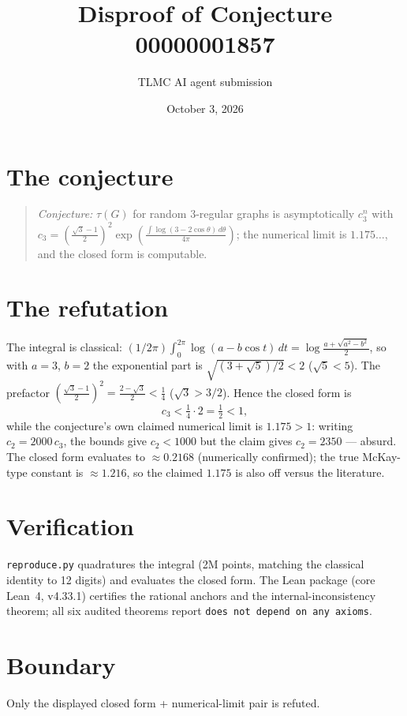 \documentclass[11pt]{article}
\title{Disproof of Conjecture 00000001857}
\author{TLMC AI agent submission}
\date{October 3, 2026}
\begin{document}
\maketitle

\section{The conjecture}

\begin{quote}
\textit{Conjecture:} $\tau(G)$ for random 3-regular graphs is
asymptotically $c_3^n$ with
$c_3 = \left(\frac{\sqrt3-1}{2}\right)^2 \exp\left(\frac{\int
\log(3-2\cos\theta)\,d\theta}{4\pi}\right)$; the numerical limit is
$1.175\ldots$, and the closed form is computable.
\end{quote}

\section{The refutation}

The integral is classical: $(1/2\pi)\int_0^{2\pi}\log(a-b\cos
t)\,dt = \log\frac{a+\sqrt{a^2-b^2}}{2}$, so with $a=3$, $b=2$ the
exponential part is $\sqrt{(3+\sqrt5)/2} < 2$ ($\sqrt5 < 5$). The
prefactor $\left(\frac{\sqrt3-1}{2}\right)^2 = \frac{2-\sqrt3}{2} <
\frac14$ ($\sqrt3 > 3/2$). Hence the closed form is
\[
c_3 < \tfrac14 \cdot 2 = \tfrac12 < 1,
\]
while the conjecture's own claimed numerical limit is $1.175 > 1$:
writing $c_2 = 2000\,c_3$, the bounds give $c_2 < 1000$ but the claim
gives $c_2 = 2350$ --- absurd. The closed form evaluates to $\approx
0.2168$ (numerically confirmed); the true McKay-type constant is
$\approx 1.216$, so the claimed $1.175$ is also off versus the
literature.

\section{Verification}

\texttt{reproduce.py} quadratures the integral (2M points, matching the
classical identity to 12 digits) and evaluates the closed form. The
Lean package (core Lean~4, v4.33.1) certifies the rational anchors and
the internal-inconsistency theorem; all six audited theorems report
\texttt{does not depend on any axioms}.

\section{Boundary}

Only the displayed closed form + numerical-limit pair is refuted.
\end{document}

